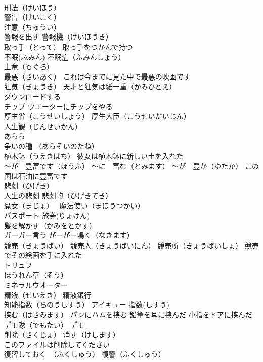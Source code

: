 \documentclass[8pt]{extreport}
\begin{document}
\begin{CJK}{UTF8}{min}
\\	刑法（けいほう）
\\	警告（けいこく）
\\	注意（ちゅうい）
\\	警報を出す 警報機（けいほうき）
\\	取っ手（とって） 取っ手をつかんで持つ
\\	不眠(ふみん) 不眠症（ふみんしょう）
\\	土竜（もぐら）
\\	最悪（さいあく） これは今までに見た中で最悪の映画です
\\	狂気（きょうき） 天才と狂気は紙一重（かみひとえ）
\\	ダウンロードする
\\	チップ ウエーターにチップをやる
\\	厚生省（こうせいしょう） 厚生大臣（こうせいだいじん）
\\	人生観（じんせいかん）
\\	あらら
\\	争いの種 （あらそいのたね）
\\	植木鉢（うえきばち） 彼女は植木鉢に新しい土を入れた
\\	～が　豊富です（ほうふ） ～に　富む（とみます） ～が　豊か（ゆたか） この国は石油に豊富です
\\	悲劇（ひげき）　
\\	人生の悲劇 悲劇的（ひげきてき）
\\	魔女（まじょ）　 魔法使い（まほうつかい）
\\	パスポート 旅券(りょけん)
\\	髪を解かす（かみをとかす）
\\	ガーガー言う がーがー鳴く（なきます）
\\	競売（きょうばい） 競売人（きょうばいにん） 競売所（きょうばいしょ） 競売でその絵画を手に入れた
\\	トリュフ
\\	ほうれん草（そう）
\\	ミネラルウオーター
\\	精液（せいえき） 精液銀行
\\	知能指数（ちのうしすう） アイキュー 指数(しすう)　
\\	挟む（はさみます） パンにハムを挟む 鉛筆を耳に挟んだ 小指をドアに挟んだ
\\	デモ隊（でもたい） デモ
\\	削除（さくじょ） 消す（けします）
\\	このファイルは削除してください
\\	復習しておく　（ふくしゅう） 復讐（ふくしゅう） 

\end{CJK}
\end{document}
